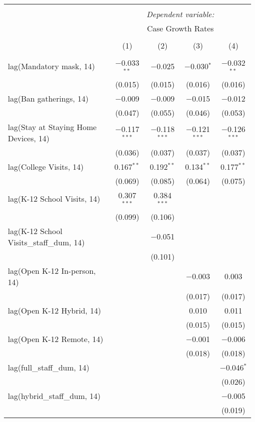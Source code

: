 \begin{tabular}{@{\extracolsep{1pt}}lcccc} 
\\[-1.8ex]\hline 
\hline \\[-1.8ex] 
 & \multicolumn{4}{c}{\textit{Dependent variable:}} \\ 
\cline{2-5} 
 & \multicolumn{4}{c}{Case Growth Rates} \\ 
\\[-1.8ex] & (1) & (2) & (3) & (4)\\ 
\hline \\[-1.8ex] 
 lag(Mandatory mask, 14) & $-$0.033$^{**}$ & $-$0.025 & $-$0.030$^{*}$ & $-$0.032$^{**}$ \\ 
  & (0.015) & (0.015) & (0.016) & (0.016) \\ 
  lag(Ban gatherings, 14) & $-$0.009 & $-$0.009 & $-$0.015 & $-$0.012 \\ 
  & (0.047) & (0.055) & (0.046) & (0.053) \\ 
  lag(Stay at Staying Home Devices, 14) & $-$0.117$^{***}$ & $-$0.118$^{***}$ & $-$0.121$^{***}$ & $-$0.126$^{***}$ \\ 
  & (0.036) & (0.037) & (0.037) & (0.037) \\ 
  lag(College Visits, 14) & 0.167$^{**}$ & 0.192$^{**}$ & 0.134$^{**}$ & 0.177$^{**}$ \\ 
  & (0.069) & (0.085) & (0.064) & (0.075) \\ 
  lag(K-12 School Visits, 14) & 0.307$^{***}$ & 0.384$^{***}$ &  &  \\ 
  & (0.099) & (0.106) &  &  \\ 
  lag(K-12 School Visits\_staff\_dum, 14) &  & $-$0.051 &  &  \\ 
  &  & (0.101) &  &  \\ 
  lag(Open K-12 In-person, 14) &  &  & $-$0.003 & 0.003 \\ 
  &  &  & (0.017) & (0.017) \\ 
  lag(Open K-12 Hybrid, 14) &  &  & 0.010 & 0.011 \\ 
  &  &  & (0.015) & (0.015) \\ 
  lag(Open K-12 Remote, 14) &  &  & $-$0.001 & $-$0.006 \\ 
  &  &  & (0.018) & (0.018) \\ 
  lag(full\_staff\_dum, 14) &  &  &  & $-$0.046$^{*}$ \\ 
  &  &  &  & (0.026) \\ 
  lag(hybrid\_staff\_dum, 14) &  &  &  & $-$0.005 \\ 
  &  &  &  & (0.019) \\ 

\end{tabular}
